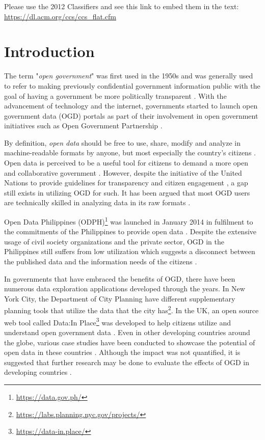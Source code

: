 \documentclass{sigchi}
\def\plainkeywords{Open government data; information seeking; }
\begin{document}

\keywords{\plainkeywords}

\printccsdesc
Please use the 2012 Classifiers and see this link to embed them in the text: \url{https://dl.acm.org/ccs/ccs_flat.cfm}

\section{Introduction}
The term "\textit{open government}" was first used in the 1950s and was generally used to refer to making previously confidential government information public with the goal of having a government be more politically transparent \cite{YuRobinson2012}. With the advancement of technology and the internet, governments started to launch open government data (OGD) portals as part of their involvement in open government initiatives such as Open Government Partnership \cite{DAWES201615, YuRobinson2012}.

By definition, \textit{open data} should be free to use, share, modify and analyze in machine-readable formats by anyone, but most especially the country's citizens \cite{corrales2019knowledge, DAWES201615}. Open data is perceived to be a useful tool for citizens to demand a more open and collaborative government \cite{warwick2017}. However, despite the initiative of the United Nations to provide guidelines for transparency and citizen engagement \cite{UN2013}, a gap still exists in utilizing OGD for such. It has been argued that most OGD users are technically skilled in analyzing data in its raw formats \cite{DAWES201615}. 

Open Data Philippines (ODPH)\footnote{\url{https://data.gov.ph/}} was launched in January 2014 in fulfilment to the commitments of the Philippines to provide open data \cite{ODPH2015}. Despite the extensive usage of civil society organizations and the private sector, OGD in the Philippines still suffers from low utilization which suggests a disconnect between the published data and the information needs of the citizens \cite{galindesZaplan2018}. 

In governments that have embraced the benefits of OGD, there have been numerous data exploration applications developed through the years. In New York City, the Department of City Planning have different supplementary planning tools that utilize the data that the city has\footnote{\url{https://labs.planning.nyc.gov/projects/}}. In the UK, an open source web tool called Data:In Place\footnote{\url{https://data-in.place/}} was developed to help citizens utilize and understand open government data \cite{puussaar2018making}. Even in other developing countries around the globe, various case studies have been conducted to showcase the potential of open data in these countries \cite{farahi2018}. Although the impact was not quantified, it is suggested that further research may be done to evaluate the effects of OGD in developing countries \cite{farahi2018}.
\end{document}
